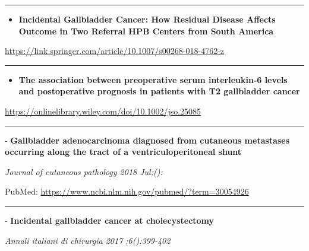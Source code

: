 \documentclass[]{article}
\providecommand{\tightlist}{%
  \setlength{\itemsep}{0pt}\setlength{\parskip}{0pt}}
\begin{document}
\begin{center}\rule{0.5\linewidth}{\linethickness}\end{center}

\begin{itemize}
\tightlist
\item
  \textbf{Incidental Gallbladder Cancer: How Residual Disease Affects
  Outcome in Two Referral HPB Centers from South America}
\end{itemize}

\url{https://link.springer.com/article/10.1007/s00268-018-4762-z}

\begin{center}\rule{0.5\linewidth}{\linethickness}\end{center}

\begin{itemize}
\tightlist
\item
  \textbf{The association between preoperative serum interleukin‐6
  levels and postoperative prognosis in patients with T2 gallbladder
  cancer}
\end{itemize}

\url{https://onlinelibrary.wiley.com/doi/10.1002/jso.25085}

\begin{center}\rule{0.5\linewidth}{\linethickness}\end{center}

 - \textbf{Gallbladder adenocarcinoma diagnosed from cutaneous
metastases occurring along the tract of a ventriculoperitoneal shunt}

\emph{Journal of cutaneous pathology 2018 Jul;():}

PubMed: \url{https://www.ncbi.nlm.nih.gov/pubmed/?term=30054926}

{}

{}

\begin{center}\rule{0.5\linewidth}{\linethickness}\end{center}

 - \textbf{Incidental gallbladder cancer at cholecystectomy}

\emph{Annali italiani di chirurgia 2017 ;6():399-402}
\end{document}

